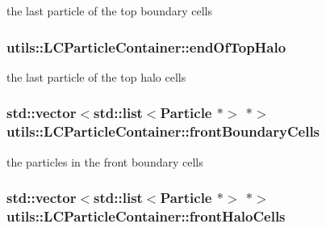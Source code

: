 the last particle of the top boundary cells \hypertarget{classutils_1_1LCParticleContainer_a67adece44e79bc57ac15202d03420d32}{
\subsubsection[{end\-Of\-Top\-Halo}]{ utils\-::\-L\-C\-Particle\-Container\-::end\-Of\-Top\-Halo\hspace{0.3cm}{\ttfamily [private]}}}\label{classutils_1_1LCParticleContainer_a67adece44e79bc57ac15202d03420d32}
the last particle of the top halo cells \hypertarget{classutils_1_1LCParticleContainer_a6c6872b4da1be4e1a5d7a5be7d9c15e1}{
\subsubsection[{front\-Boundary\-Cells}]{\setlength{\rightskip}{0pt plus 5cm}std\-::vector$<$std\-::list$<${\bf Particle} $\ast$$>$ $\ast$$>$ utils\-::\-L\-C\-Particle\-Container\-::front\-Boundary\-Cells\hspace{0.3cm}{\ttfamily [private]}}}\label{classutils_1_1LCParticleContainer_a6c6872b4da1be4e1a5d7a5be7d9c15e1}
the particles in the front boundary cells \hypertarget{classutils_1_1LCParticleContainer_a242688f7a6578b42ee85c5c309a08a05}{
\subsubsection[{front\-Halo\-Cells}]{\setlength{\rightskip}{0pt plus 5cm}std\-::vector$<$std\-::list$<${\bf Particle} $\ast$$>$ $\ast$$>$ utils\-::\-L\-C\-Particle\-Container\-::front\-Halo\-Cells\hspace{0.3cm}{\ttfamily [private]}}}\label{classutils_1_1LCParticleContainer_a242688f7a6578b42ee85c5c309a08a05}

